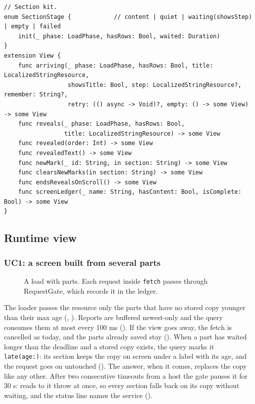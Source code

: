 \begin{lstlisting}
// Section kit.
enum SectionStage {            // content | quiet | waiting(showsStep) | empty | failed
    init(_ phase: LoadPhase, hasRows: Bool, waited: Duration)
}
extension View {
    func arriving(_ phase: LoadPhase, hasRows: Bool, title: LocalizedStringResource,
                  showsTitle: Bool, step: LocalizedStringResource?, remember: String?,
                  retry: (() async -> Void)?, empty: () -> some View) -> some View
    func reveals(_ phase: LoadPhase, hasRows: Bool,
                 title: LocalizedStringResource) -> some View
    func revealed(order: Int) -> some View
    func revealedText() -> some View
    func newMark(_ id: String, in section: String) -> some View
    func clearsNewMarks(in section: String) -> some View
    func endsRevealsOnScroll() -> some View
    func screenLedger(_ name: String, hasContent: Bool, isComplete: Bool) -> some View
}
\end{lstlisting}

\subsection{Runtime view}

\subsubsection{UC1: a screen built from several parts}
\begin{figure}[H]
\centering
{}
\caption{A load with parts. Each request inside \texttt{fetch} passes through RequestGate, which records it in the ledger.}
\end{figure}

The loader passes the resource only the parts that have no stored copy younger
than their max age (, ). Reports are buffered newest-only and
the query consumes them at most every 100 ms (). If the view goes away,
the fetch is cancelled as today, and the parts already saved stay ().
When a part has waited longer than the deadline and a stored copy exists, the
query marks it \texttt{late(age:)}: its section keeps the copy on screen under a
label with its age, and the request goes on untouched (). The answer,
when it comes, replaces the copy like any other. After two consecutive timeouts
from a host the gate pauses it for 30 s: reads to it throw at once, so every
section falls back on its copy without waiting, and the status line names the
service ().


